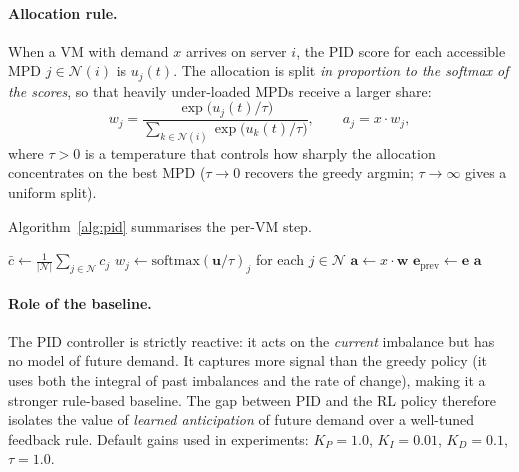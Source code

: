 \documentclass[11pt]{article}
\begin{document}
\paragraph{Allocation rule.}
When a VM with demand $x$ arrives on server $i$, the PID score for each
accessible MPD $j \in \mathcal{N}(i)$ is $u_j(t)$.  The allocation is
split \emph{in proportion to the softmax of the scores}, so that heavily
under-loaded MPDs receive a larger share:
\[
    w_j = \frac{\exp\!\bigl(u_j(t) / \tau\bigr)}
               {\sum_{k \in \mathcal{N}(i)} \exp\!\bigl(u_k(t) / \tau\bigr)},
    \qquad
    a_j = x \cdot w_j,
\]
where $\tau > 0$ is a temperature that controls how sharply the allocation
concentrates on the best MPD ($\tau \to 0$ recovers the greedy argmin;
$\tau \to \infty$ gives a uniform split).

Algorithm~\ref{alg:pid} summarises the per-VM step.

\begin{algorithm}[H]
\SetAlgoLined
{}
$\bar{c} \leftarrow \frac{1}{|\mathcal{N}|}\sum_{j \in \mathcal{N}} c_j$\;
$w_j \leftarrow \mathrm{softmax}(\mathbf{u} / \tau)_j$ for each $j \in \mathcal{N}$\;
$\mathbf{a} \leftarrow x \cdot \mathbf{w}$\;
$\mathbf{e}_{\text{prev}} \leftarrow \mathbf{e}$\;
\Return $\mathbf{a}$\;
\caption{PID allocation for a single VM arrival.}
\label{alg:pid}
\end{algorithm}

\paragraph{Role of the baseline.}
The PID controller is strictly reactive: it acts on the \emph{current}
imbalance but has no model of future demand.  It captures more signal than
the greedy policy (it uses both the integral of past imbalances and the
rate of change), making it a stronger rule-based baseline.  The gap between
PID and the RL policy therefore isolates the value of \emph{learned
anticipation} of future demand over a well-tuned feedback rule.
Default gains used in experiments: $K_P = 1.0$, $K_I = 0.01$,
$K_D = 0.1$, $\tau = 1.0$.
\end{document}
